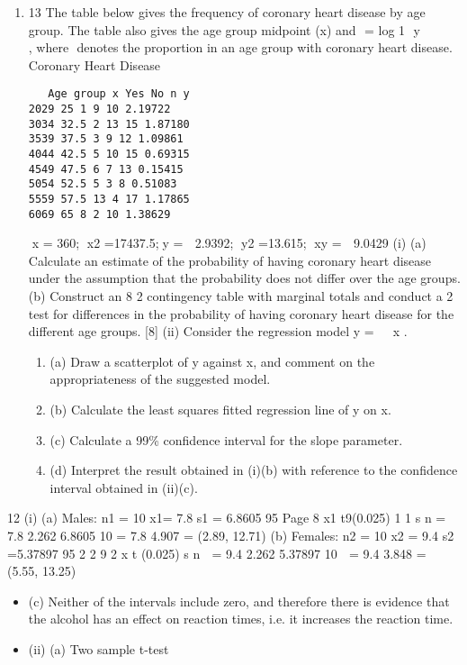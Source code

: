 \documentclass[a4paper,12pt]{article}
\begin{document}
\begin{enumerate}
\item 13 The table below gives the frequency of coronary heart disease by age group. The
table also gives the age group midpoint (x) and

= log 1 
y
  
     
, where  denotes the
proportion in an age group with coronary heart disease.
Coronary Heart
Disease
\begin{verbatim}
   Age group x Yes No n y
2029 25 1 9 10 2.19722
3034 32.5 2 13 15 1.87180
3539 37.5 3 9 12 1.09861
4044 42.5 5 10 15 0.69315
4549 47.5 6 7 13 0.15415
5054 52.5 5 3 8 0.51083
5559 57.5 13 4 17 1.17865
6069 65 8 2 10 1.38629 
\end{verbatim}

x = 360; x2 =17437.5;y =  2.9392; y2 =13.615; xy =  9.0429
(i) (a) Calculate an estimate of the probability of having coronary heart
disease under the assumption that the probability does not differ over
the age groups.
(b) Construct an 8 	 2 contingency table with marginal totals and conduct
a 2
 test for differences in the probability of having coronary heart
disease for the different age groups. [8]
(ii) Consider the regression model y =  x .

\begin{enumerate}
    \item (a) Draw a scatterplot of y against x, and comment on the appropriateness
of the suggested model.
    \item (b) Calculate the least squares fitted regression line of y on x.
    \item (c) Calculate a 99\% confidence interval for the slope parameter.
    \item (d) Interpret the result obtained in (i)(b) with reference to the confidence
interval obtained in (ii)(c). 
\end{enumerate}

\end{enumerate}

\newpage

12 (i) (a) Males: n1 = 10 x1= 7.8 s1 = 6.8605
95%
Page 8
x1 
 t9(0.025) 1
1
s
n
= 7.8 
 2.262 6.8605
10
= 7.8 
 4.907
= (2.89, 12.71)
(b) Females: n2 = 10 x2 = 9.4 s2 =5.37897
95%
2
2 9
2
x t (0.025) s
n

= 9.4 2.262 5.37897
10
 = 9.4 
 3.848
= (5.55, 13.25)

\begin{itemize}
    \item (c) Neither of the intervals include zero, and therefore there is evidence
that the alcohol has an effect on reaction times, i.e. it increases the
reaction time.
\item (ii) (a) Two sample t-test
\end{itemize}
\end{document}
